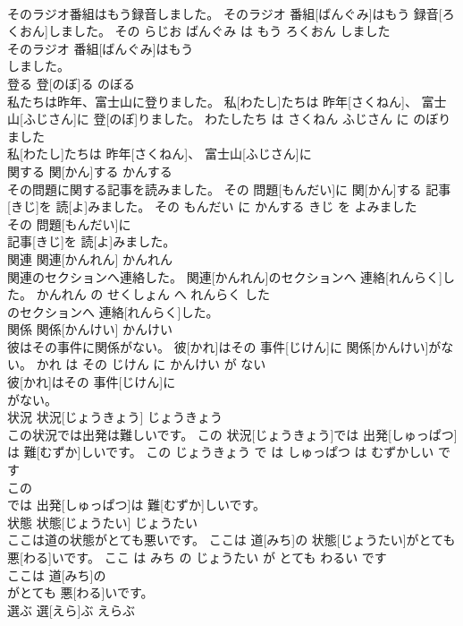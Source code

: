 \documentclass[8pt]{extreport}
\begin{document}
\begin{CJK}{UTF8}{min}
\\	そのラジオ番組はもう録音しました。	そのラジオ 番組[ばんぐみ]はもう 録音[ろくおん]しました。	その らじお ばんぐみ は もう ろくおん しました	
\\	そのラジオ 番組[ばんぐみ]はもう
\\	しました。			
\\	登る	登[のぼ]る	のぼる	
\\	私たちは昨年、富士山に登りました。	私[わたし]たちは 昨年[さくねん]、 富士山[ふじさん]に 登[のぼ]りました。	わたしたち は さくねん ふじさん に のぼりました	
\\	私[わたし]たちは 昨年[さくねん]、 富士山[ふじさん]に
\\	関する	関[かん]する	かんする	
\\	その問題に関する記事を読みました。	その 問題[もんだい]に 関[かん]する 記事[きじ]を 読[よ]みました。	その もんだい に かんする きじ を よみました	
\\	その 問題[もんだい]に
\\	記事[きじ]を 読[よ]みました。			
\\	関連	関連[かんれん]	かんれん	
\\	関連のセクションへ連絡した。	関連[かんれん]のセクションへ 連絡[れんらく]した。	かんれん の せくしょん へ れんらく した	
\\	のセクションへ 連絡[れんらく]した。			
\\	関係	関係[かんけい]	かんけい	
\\	彼はその事件に関係がない。	彼[かれ]はその 事件[じけん]に 関係[かんけい]がない。	かれ は その じけん に かんけい が ない	
\\	彼[かれ]はその 事件[じけん]に
\\	がない。			
\\	状況	状況[じょうきょう]	じょうきょう	
\\	この状況では出発は難しいです。	この 状況[じょうきょう]では 出発[しゅっぱつ]は 難[むずか]しいです。	この じょうきょう で は しゅっぱつ は むずかしい です	
\\	この
\\	では 出発[しゅっぱつ]は 難[むずか]しいです。			
\\	状態	状態[じょうたい]	じょうたい	
\\	ここは道の状態がとても悪いです。	ここは 道[みち]の 状態[じょうたい]がとても 悪[わる]いです。	ここ は みち の じょうたい が とても わるい です	
\\	ここは 道[みち]の
\\	がとても 悪[わる]いです。			
\\	選ぶ	選[えら]ぶ	えらぶ	

\end{CJK}
\end{document}
